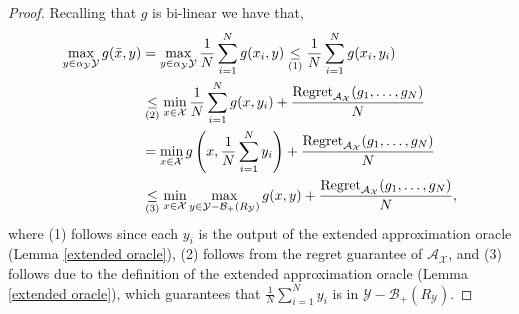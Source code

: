 \documentclass[a4paper,12pt]{article}
\newcommand{\mY}{\mathcal{Y}}
\newcommand{\mX}{\mathcal{X}}
\newcommand{\mA}{\mathcal{A}}
\newcommand{\mB}{\mathcal{B}}
\begin{document}
\begin{proof}
Recalling that $g$ is bi-linear we have that,
\begin{align*}
\max_{y \in \alpha_{\mY} \mY } g(\bar{x},y) &= \max_{y \in \alpha_{\mY} \mY } \frac{1}{N}\sum_{i=1}^Ng(x_i,y) \underset{(1)}{\leq} \frac{1}{N}\sum_{i=1}^N g(x_i,y_i) \notag \\
&\underset{(2)}{\leq} \min_{x \in \mX}\frac{1}{N}\sum_{i=1}^N g(x,y_i)+\frac{\text{Regret}_{\mathcal{A}_\mX}(g_1,\dots,g_N)}{N} \notag \\
&= \min_{x \in \mX} g\left({x,\frac{1}{N}\sum_{i=1}^Ny_i}\right)+ \frac{\text{Regret}_{\mathcal{A}_\mX}(g_1,\dots,g_N)}{N}
\notag \\
&\underset{(3)}{\leq} \min_{x \in \mX}  \max_{y\in \mY-\mB_+(R_{\mY})} g(x,y)+ \frac{\text{Regret}_{\mathcal{A}_\mX}(g_1,\dots,g_N)}{N},
\end{align*}
where (1) follows since each $y_i$ is the output of the extended approximation oracle  (Lemma \ref{extended oracle}), (2) follows from the regret guarantee of $\mA_{\mX}$, and (3) follows due to the definition of the extended approximation oracle (Lemma \ref{extended oracle}), which guarantees that $\frac{1}{N}\sum_{i=1}^Ny_i$ is in $\mY-\mB_+(R_{\mY})$.


\end{proof}
\end{document}
